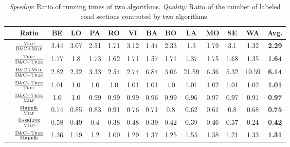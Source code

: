 \documentclass[a4paper,11pt]{article}
\newcommand{\GreedyAlgo}{\textsc{Base\-Line}\xspace}
\newcommand{\TreeAlgo}{\textsc{Tree}\xspace}
\newcommand{\ILPAlgo}{\textsc{Milp}\xspace}
\newcommand{\Shredder}{\textsc{D\&C}}
\begin{document}
\begin{table}[t]
  \caption{\emph{Speedup}: Ratio of running times of two algorithms. \emph{Quality:} Ratio of the number of labeled road sections computed by two algorithms. }
\label{table:speedup}
\centering
\small
\begin{tabular}{lccccccccccccc}
\toprule
 & Ratio & BE & LO & PA & RO & VI & BA & BO & LA & MO & SE & WA & \textbf{Avg.}\\ \midrule
\parbox[t]{1mm}{}
 & $\frac{\ILPAlgo}{\Shredder+\ILPAlgo}$ & 3.44 & 3.07 & 2.51 & 1.71 & 3.12 & 1.44 & 2.33 & 1.3 & 1.79 & 3.1 & 1.32 & \textbf{2.29}\vspace{1ex}\\
 & $\frac{\TreeAlgo}{\Shredder+\TreeAlgo}$ & 1.77 & 1.8 & 1.73 & 1.62 & 1.71 & 1.57 & 1.71 & 1.37 & 1.75 & 1.68 & 1.35 & \textbf{1.64}\vspace{1ex}\\
 & $\frac{\Shredder+\ILPAlgo}{\Shredder+\TreeAlgo}$ & 2.82 & 2.32 & 3.33 & 2.54 & 2.74 & 6.84 & 3.06 & 21.59 & 6.36 & 5.32 & 10.59 & \textbf{6.14}\vspace{1ex}\\
\midrule
 \parbox[t]{1mm}{}
  & $\frac{\Shredder+\TreeAlgo}{\TreeAlgo}$ & 1.01 & 1.0 & 1.0 & 1.0 & 1.01 & 1.01 & 1.0 & 1.01 & 1.02 & 1.01 & 1.02 & \textbf{1.01}\vspace{1ex}\\
 & $\frac{\Shredder+\TreeAlgo}{\ILPAlgo}$ & 1.0 & 1.0 & 0.99 & 0.99 & 0.99 & 0.96 & 0.99 & 0.96 & 0.97 & 0.97 & 0.91 & \textbf{0.97}\vspace{1ex}\\
 & $\frac{\text{Mapnik}}{\ILPAlgo}$ & 0.74 & 0.85 & 0.83 & 0.91 & 0.76 & 0.71 & 0.8 & 0.62 & 0.61 & 0.8 & 0.68 & \textbf{0.75}\vspace{1ex}\\
 & $\frac{\GreedyAlgo}{\ILPAlgo}$ & 0.58 & 0.49 & 0.4 & 0.38 & 0.48 & 0.39 & 0.42 & 0.39 & 0.46 & 0.37 & 0.24 & \textbf{0.42}\vspace{1ex}\\
 & $\frac{\Shredder+\TreeAlgo}{\text{Mapnik}}$ & 1.36 & 1.19 & 1.2 & 1.09 & 1.29 & 1.37 & 1.25 & 1.55 & 1.58 & 1.21 & 1.33 & \textbf{1.31}\vspace{1ex}\\
\bottomrule
\end{tabular}
\end{table}
\end{document}
